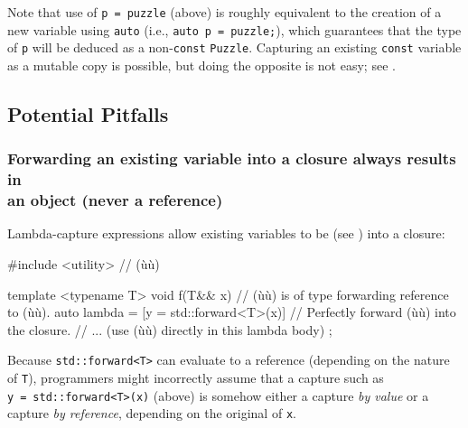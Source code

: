 \noindent Note that use of \lstinline!p!~\lstinline!=!~\lstinline!puzzle! (above) is
roughly equivalent to the creation of a new variable using
\lstinline!auto! (i.e.,
\lstinline!auto!~\lstinline!p!~\lstinline!=!~\lstinline!puzzle;!), which guarantees
that the type of \lstinline!p! will be deduced as a non-\lstinline!const!
\lstinline!Puzzle!. Capturing an existing \lstinline!const! variable as a mutable copy is
possible, but doing the opposite is not easy; see .

\subsection[Potential Pitfalls]{Potential Pitfalls}\label{potential-pitfalls-lambdacapture}

\subsubsection[Forwarding an existing variable into a closure always results in an object (never a reference)]{Forwarding an existing variable into a closure always results in\\ an object (never a reference)}\label{forwarding-an-existing-variable-into-a-closure-always-results-in-an-object-(never-a-reference)}

Lambda-capture expressions allow existing variables to be
 (see )
into a closure:

\begin{emcppslisting}[emcppsstandards={c++14}]
#include <utility>  // (ù{}ù)

template <typename T>
void f(T&& x)  // (ù{}ù) is of type forwarding reference to (ù{}ù).
{
    auto lambda = [y = std::forward<T>(x)]  
        // Perfectly forward (ù{}ù) into the closure.
    {
        // ... (use (ù{}ù) directly in this lambda body)
    };
}
\end{emcppslisting}
    
\noindent Because \lstinline!std::forward<T>! can evaluate to a reference (depending
on the nature of \lstinline!T!), programmers might incorrectly assume that
a capture such as \lstinline!y!~\lstinline!=!~\lstinline!std::forward<T>(x)!
(above) is somehow either a capture \emph{by value} or a capture
\emph{by reference}, depending on the original 
of \lstinline!x!.

